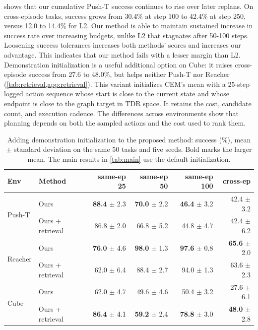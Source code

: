 \documentclass{article}
\theoremstyle{definition}
\theoremstyle{remark}
\begin{document}
 shows that our cumulative Push-T success continues to rise over
later replans. On cross-episode tasks, success grows from 30.4\% at step 100 to
42.4\% at step 250, versus 12.0 to 14.4\% for L2. Our method is able to maintain sustained increase in success rate over increasing budgets, unlike L2 that stagnates after 50-100 steps.
Loosening success tolerances increases both methods' scores and increases our advantage. This indicates that our method fails with a lesser margin than L2.
Demonstration initialization is a useful additional option on Cube: it raises
cross-episode success from 27.6 to 48.0\%, but helps neither Push-T nor Reacher
(\cref{tab:retrieval,app:retrieval}).
This variant initializes CEM's mean with a 25-step logged action sequence whose
start is close to the current state and whose endpoint is close to the graph target
in TDR space. It retains the cost, candidate count, and execution cadence.
The differences across environments show that planning depends on both the sampled
actions and the cost used to rank them.

\begin{table}[t]
\centering\small
\caption{Adding demonstration initialization to the proposed method: success (\%), mean $\pm$ standard deviation on the same 50 tasks and five seeds. Bold marks the larger mean. The main results in \cref{tab:main} use the default initialization.}
\label{tab:retrieval}
\begin{tabular}{llrrrr}
\toprule
Env & Method & same-ep 25 & same-ep 50 & same-ep 100 & cross-ep \\
\midrule
\multirow{2}{*}{Push-T} & Ours & \textbf{88.4} $\pm$ 2.3 & \textbf{70.0} $\pm$ 2.2 & \textbf{46.4} $\pm$ 3.2 & 42.4 $\pm$ 3.2 \\
 & Ours + retrieval & 86.8 $\pm$ 2.0 & 66.8 $\pm$ 5.2 & 44.8 $\pm$ 4.7 & 42.4 $\pm$ 6.2 \\
\midrule
\multirow{2}{*}{Reacher} & Ours & \textbf{76.0} $\pm$ 4.6 & \textbf{98.0} $\pm$ 1.3 & \textbf{97.6} $\pm$ 0.8 & \textbf{65.6} $\pm$ 2.0 \\
 & Ours + retrieval & 62.0 $\pm$ 6.4 & 88.4 $\pm$ 2.7 & 94.0 $\pm$ 1.3 & 63.6 $\pm$ 2.3 \\
\midrule
\multirow{2}{*}{Cube} & Ours & 62.0 $\pm$ 4.7 & 49.6 $\pm$ 4.6 & 50.4 $\pm$ 3.2 & 27.6 $\pm$ 6.1 \\
 & Ours + retrieval & \textbf{86.4} $\pm$ 4.1 & \textbf{59.2} $\pm$ 2.4 & \textbf{78.8} $\pm$ 3.0 & \textbf{48.0} $\pm$ 2.8 \\
\bottomrule
\end{tabular}
\end{table}
\end{document}
